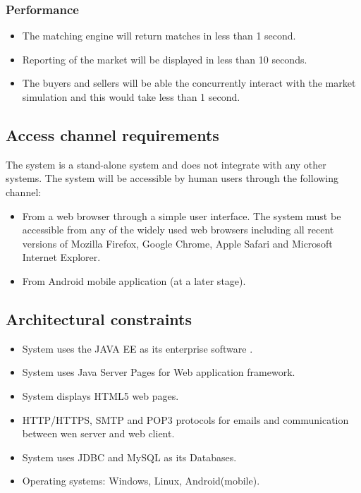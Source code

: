 \documentclass[12pt]{article}
\begin{document}
			    	\subsubsection{Performance}
			    	\begin{itemize}
			    		\item The matching engine will return matches in less than 1 second.
			    		\item Reporting of the market will be displayed in less than 10 seconds.
			   	    	\item The buyers and sellers will be able the concurrently interact with the market simulation and this would take less than 1 second.	
			    	\end{itemize} 
			    	
			    	
			    		
			   \subsection{Access channel requirements}	
			   		The system is a stand-alone system and does not integrate with any other systems.
			   		The system will be accessible by human users through the following channel:
			   		\begin{itemize}
			   			\item From a web browser through a simple user interface. The system must be accessible from any of the widely used web browsers including all recent versions of Mozilla Firefox, Google Chrome, Apple Safari and Microsoft Internet Explorer. 
			   			\item From Android mobile application (at a later stage).
			   		\end{itemize}
			   			
			   	\subsection{Architectural constraints}	
					\begin{itemize}
						 \item System uses the JAVA EE as its enterprise software .
						 \item System uses Java Server Pages for Web application framework.
						 \item System displays HTML5 web pages.
						 \item HTTP/HTTPS, SMTP and POP3 protocols for emails and communication between wen server and web client.
						 \item System uses JDBC and MySQL as its Databases.
						 \item Operating systems: Windows, Linux, Android(mobile).
					\end{itemize}						    	    
\end{document}
